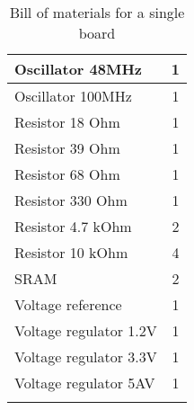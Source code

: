 \begin{longtable}{|l|c|}
	Oscillator 48MHz & 1 \\ \hline
	Oscillator 100MHz & 1 \\ \hline
	Resistor 18 Ohm & 1 \\ \hline
	Resistor 39 Ohm & 1 \\ \hline
	Resistor 68 Ohm & 1 \\ \hline
	Resistor 330 Ohm & 1 \\ \hline
	Resistor 4.7 kOhm & 2 \\ \hline
	Resistor 10 kOhm & 4 \\ \hline
	SRAM & 2 \\ \hline
	Voltage reference & 1 \\ \hline
	Voltage regulator 1.2V & 1 \\ \hline
	Voltage regulator 3.3V & 1 \\ \hline
	Voltage regulator 5AV & 1 \\
	\hline
	\caption{Bill of materials for a single board}
	\label{tab:bom}
\end{longtable}
